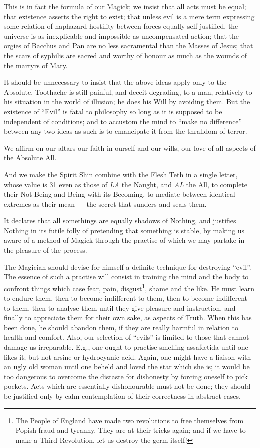 This is in fact the formula of our Magick; we insist that all acts must be equal; that existence asserts the right to exist; that unless evil is a mere term expressing some relation of haphazard hostility between forces equally self-justified, the universe is as inexplicable and impossible as uncompensated action; that the orgies of Bacchus and Pan are no less sacramental than the Masses of Jesus; that the scars of syphilis are sacred and worthy of honour as much as the wounds of the martyrs of Mary.

It should be unnecessary to insist that the above ideas apply only to the Absolute. Toothache is still painful, and deceit degrading, to a man, relatively to his situation in the world of illusion; he does his Will by avoiding them. But the existence of \enquote{Evil} is fatal to philosophy so long as it is supposed to be independent of conditions; and to accustom the mind to \enquote{make no difference} between any two ideas as such is to emancipate it from the thralldom of terror.

We affirm on our altars our faith in ourself and our wills, our love of all aspects of the Absolute All.

And we make the Spirit Shin combine with the Flesh Teth in a single letter, whose value is 31 even as those of \textit{LA} the Naught, and \textit{AL} the All, to complete their Not-Being and Being with its Becoming, to mediate between identical extremes as their mean --- the secret that sunders and seals them.

It declares that all somethings are equally shadows of Nothing, and justifies Nothing in its futile folly of pretending that something is stable, by making us aware of a method of Magick through the practise of which we may partake in the pleasure of the process.

The Magician should devise for himself a definite technique for destroying \enquote{evil}. The essence of such a practise will consist in training the mind and the body to confront things which case fear, pain, disgust\footnote{The People of England have made two revolutions to free themselves from Popish fraud and tyranny. They are at their tricks again; and if we have to make a Third Revolution, let us destroy the germ itself!}, shame and the like. He must learn to endure them, then to become indifferent to them, then to become indifferent to them, then to analyse them until they give pleasure and instruction, and finally to appreciate them for their own sake, as aspects of Truth. When this has been done, he should abandon them, if they are really harmful in relation to health and comfort. Also, our selection of \enquote{evils} is limited to those that cannot damage us irreparable. E.g., one ought to practise smelling assaf\oe{}tida until one likes it; but not arsine or hydrocyanic acid. Again, one might have a liaison with an ugly old woman until one beheld and loved the star which she is; it would be too dangerous to overcome the distaste for dishonesty by forcing oneself to pick pockets. Acts which are essentially dishonourable must not be done; they should be justified only by calm contemplation of their correctness in abstract cases.

